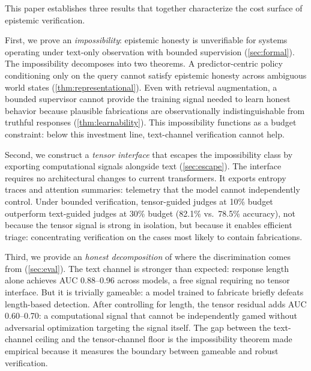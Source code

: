 
This paper establishes three results that together characterize the cost
surface of epistemic verification.

First, we prove an \emph{impossibility}: epistemic honesty is unverifiable
for systems operating under text-only observation with bounded supervision
(\autoref{sec:formal}). The impossibility decomposes into two theorems. A
predictor-centric policy conditioning only on the query cannot satisfy
epistemic honesty across ambiguous world states
(\autoref{thm:representational}). Even with retrieval augmentation, a
bounded supervisor cannot provide the training signal needed to learn
honest behavior because plausible fabrications are observationally
indistinguishable from truthful responses (\autoref{thm:learnability}).
This impossibility functions as a budget constraint: below this investment
line, text-channel verification cannot help.

Second, we construct a \emph{tensor interface} that escapes the
impossibility class by exporting computational signals alongside text
(\autoref{sec:escape}). The interface requires no architectural changes to
current transformers. It exports entropy traces and attention
summaries: telemetry that the model cannot independently control. Under
bounded verification, tensor-guided judges at 10\% budget outperform
text-guided judges at 30\% budget (82.1\% vs.\ 78.5\% accuracy), not
because the tensor signal is strong in isolation, but because it enables
efficient triage: concentrating verification on the cases most likely to
contain fabrications.

Third, we provide an \emph{honest decomposition} of where the
discrimination comes from (\autoref{sec:eval}). The text channel is
stronger than expected: response length alone achieves AUC 0.88--0.96
across models, a free signal requiring no tensor interface. But it is
trivially gameable: a model trained to fabricate briefly defeats
length-based detection. After controlling for length, the tensor residual
adds AUC 0.60--0.70: a computational signal that cannot be independently
gamed without adversarial optimization targeting the signal itself. The gap
between the text-channel ceiling and the tensor-channel floor is the
impossibility theorem made empirical because it measures the boundary between
gameable and robust verification.


